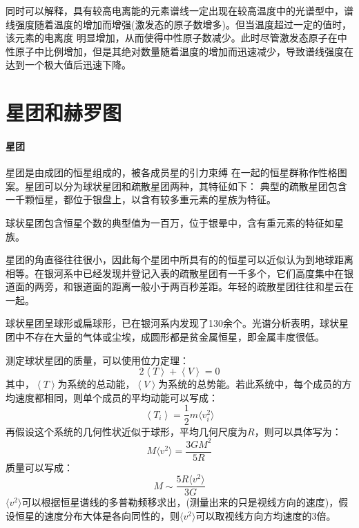同时可以解释，具有较高电离能的元素谱线一定出现在较高温度中的光谱型中，谱线强度随着温度的增加而增强(激发态的原子数增多)。但当温度超过一定的值时，该元素的电离度 明显增加，从而使得中性原子数减少。此时尽管激发态原子在中性原子中比例增加，但是其绝对数量随着温度的增加而迅速减少，导致谱线强度在达到一个极大值后迅速下降。
\section{星团和赫罗图}
\paragraph{星团}
星团是由成团的恒星组成的，被各成员星的引力束缚 在一起的恒星群称作性格图案。星团可以分为球状星团和疏散星团两种，其特征如下：
典型的疏散星团包含一千颗恒星，都位于银盘上，以含有较多重元素的星族为特征。

球状星团包含恒星个数的典型值为一百万，位于银晕中，含有重元素的特征如星族。

星团的角直径往往很小，因此每个星团中所具有的的恒星可以近似认为到地球距离相等。在银河系中已经发现并登记入表的疏散星团有一千多个，它们高度集中在银道面的两旁，和银道面的距离一般小于两百秒差距。年轻的疏散星团往往和星云在一起。

球状星团呈球形或扁球形，已在银河系内发现了130余个。光谱分析表明，球状星团中不存在大量的气体或尘埃，成圆形都是贫金属恒星，即金属丰度很低。

测定球状星团的质量，可以使用位力定理：
\begin{equation}
	2\left\langle T\right\rangle+\left\langle V\right\rangle =0
\end{equation}
其中，$\left\langle T\right\rangle$为系统的总动能，$\left\langle V\right\rangle$为系统的总势能。若此系统中，每个成员的方均速度都相同，则单个成员的平均动能可以写成：
\begin{equation}
	\left\langle T_{i}\right\rangle=\frac{1}{2}m\langle v_{i}^2\rangle
\end{equation}
再假设这个系统的几何性状近似于球形，平均几何尺度为$R$，则可以具体写为：
\begin{equation}
	M\langle v^2\rangle =\frac{3GM^2}{5R}
\end{equation}
质量可以写成：
\begin{equation}
	M\sim \frac{5R\langle v^2\rangle}{3G}
\end{equation}
$\langle v^2\rangle$可以根据恒星谱线的多普勒频移求出，(测量出来的只是视线方向的速度)，假设恒星的速度分布大体是各向同性的，则$\langle v^2\rangle$可以取视线方向方均速度的3倍。
